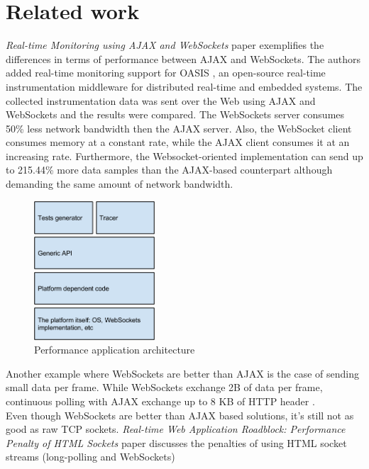 \documentclass[conference]{IEEEtran}
\begin{document}
\section{Related work}
\textit{Real-time Monitoring using AJAX and WebSockets} paper \cite{RT-Monitoring}
exemplifies the differences in terms of performance between AJAX and WebSockets.
The authors added real-time monitoring support for OASIS \cite{OASIS},
an open-source real-time instrumentation middleware for distributed real-time
and embedded systems. The collected instrumentation data was sent over the Web
using AJAX and WebSockets and the results were compared. The WebSockets server
consumes 50\% less network bandwidth then the AJAX server. Also, the WebSocket
client consumes memory at a constant rate, while the AJAX client consumes it
at an increasing rate. Furthermore, the Websocket-oriented implementation can
send up to 215.44\% more data samples than the AJAX-based counterpart although
demanding the same amount of network bandwidth.
\\
\begin{frame}{}
  \begin{figure}
    \centering
    \includegraphics[width=0.4\textwidth]{Architecture.png}
    \caption{Performance application architecture}
  \end{figure}
\end{frame}
\indent
Another example where WebSockets are better than AJAX is the case of sending
small data per frame. While WebSockets exchange 2B of data per frame, continuous
polling with AJAX exchange up to 8 KB of HTTP header \cite{2009:Misc}.
\\
\indent
Even though WebSockets are better than AJAX based solutions, it's still not as
good as raw TCP sockets. \textit{Real-time Web Application Roadblock:
Performance Penalty of HTML Sockets} paper \cite{Performance-Penalty} discusses
the penalties of using HTML socket streams (long-polling and WebSockets)
\end{document}
